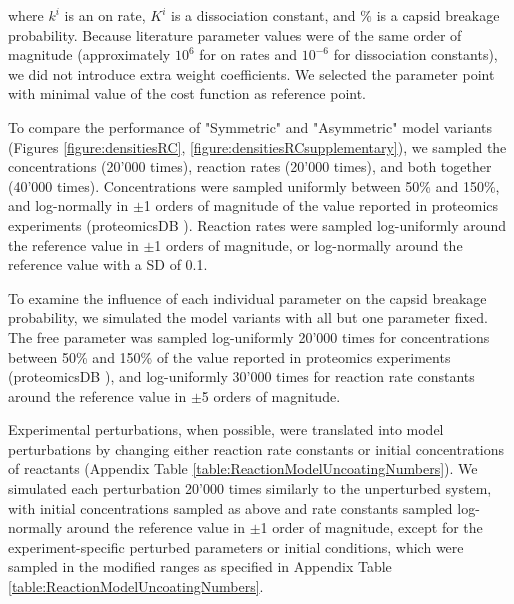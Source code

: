 where $k^i$ is an on rate, $K^i$ is a dissociation constant, and $\%$ is a capsid breakage probability. Because literature parameter values were of the same order of magnitude (approximately $10^6$ for on rates and $10^{-6}$ for dissociation constants), we did not introduce extra weight coefficients. We selected the parameter point with minimal value of the cost function as reference point.

To compare the performance of "Symmetric" and "Asymmetric" model variants (Figures \ref{figure:densitiesRC}, \ref{figure:densitiesRCsupplementary}), we sampled the concentrations (20’000 times), reaction rates (20’000 times), and both together (40’000 times). Concentrations were sampled uniformly between 50\% and 150\%, and log-normally in $\pm$1 orders of magnitude of the value reported in proteomics experiments (proteomicsDB \cite{schmidt2018proteomicsdb}). Reaction rates were sampled log-uniformly around the reference value in $\pm$1 orders of magnitude, or log-normally around the reference value with a SD of 0.1.

To examine the influence of each individual parameter on the capsid breakage probability, we simulated the model variants with all but one parameter fixed. The free parameter was sampled log-uniformly 20’000 times for concentrations between 50\% and 150\% of the value reported in proteomics experiments (proteomicsDB \cite{schmidt2018proteomicsdb}), and log-uniformly 30’000 times for reaction rate constants around the reference value in $\pm$5 orders of magnitude.

Experimental perturbations, when possible, were translated into model perturbations by changing either reaction rate constants or initial concentrations of reactants (Appendix Table \ref{table:ReactionModelUncoatingNumbers}). We simulated each perturbation 20’000 times similarly to the unperturbed system, with initial concentrations sampled as above and rate constants sampled log-normally around the reference value in $\pm$1 order of magnitude, except for the experiment-specific perturbed parameters or initial conditions, which were sampled in the modified ranges as specified in Appendix Table \ref{table:ReactionModelUncoatingNumbers}.

